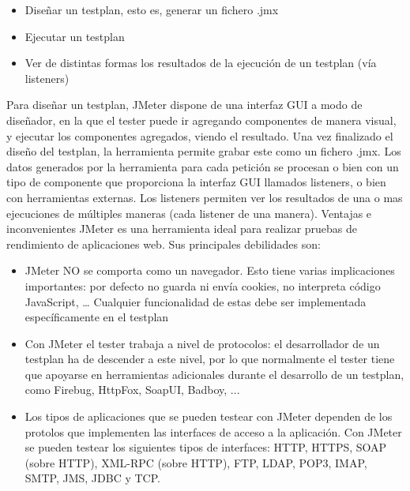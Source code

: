 \documentclass{article}
\begin{document}
\begin{itemize}
    \item Diseñar un testplan, esto es, generar un fichero .jmx
    \item Ejecutar un testplan
    \item Ver de distintas formas los resultados de la ejecución de un testplan (vía listeners)
\end{itemize} 
\newline 
Para diseñar un testplan, JMeter dispone de una interfaz GUI a modo de diseñador, en la que el tester puede ir agregando componentes de manera visual, y ejecutar los componentes agregados, viendo el resultado. Una vez finalizado el diseño del testplan, la herramienta permite grabar este como un fichero .jmx.
\newline
\newline
Los datos generados por la herramienta para cada petición se procesan o bien con un tipo de componente que proporciona la interfaz GUI llamados listeners, o bien con herramientas externas. Los listeners permiten ver los resultados de una o mas ejecuciones de múltiples maneras (cada listener de una manera).
\newline 
\newline 
Ventajas e inconvenientes
\newline 
\newline 
JMeter es una herramienta ideal para realizar pruebas de rendimiento de aplicaciones web. Sus principales debilidades son:
\begin{itemize}
    \item JMeter NO se comporta como un navegador. Esto tiene varias implicaciones importantes: por defecto no guarda ni envía cookies, no interpreta código JavaScript, … Cualquier funcionalidad de estas debe ser implementada específicamente en el testplan
    \item Con JMeter el tester trabaja a nivel de protocolos: el desarrollador de un testplan ha de descender a este nivel, por lo que normalmente el tester tiene que apoyarse en herramientas adicionales durante el desarrollo de un testplan, como Firebug, HttpFox, SoapUI, Badboy, ...
    \item Los tipos de aplicaciones que se pueden testear con JMeter dependen de los protolos que implementen las interfaces de acceso a la aplicación. Con JMeter se pueden testear los siguientes tipos de interfaces: HTTP, HTTPS, SOAP (sobre HTTP), XML-RPC (sobre HTTP), FTP, LDAP, POP3, IMAP, SMTP, JMS, JDBC y TCP. 
\end{itemize} 
\end{document}
